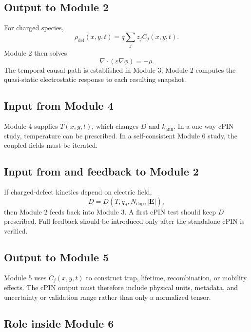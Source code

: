 \documentclass[11pt]{article}
\begin{document}
\subsection{Output to Module 2}

For charged species,
\begin{equation}
\rho_{\mathrm{def}}(x,y,t)
=
q\sum_jz_jC_j(x,y,t).
\end{equation}
Module 2 then solves
\begin{equation}
\nabla\cdot(\varepsilon\nabla\phi)
=
-\rho.
\end{equation}
The temporal causal path is established in Module 3; Module 2 computes the quasi-static electrostatic response to each resulting snapshot.

\subsection{Input from Module 4}

Module 4 supplies $T(x,y,t)$, which changes $D$ and $k_{\mathrm{ann}}$. In a one-way cPIN study, temperature can be prescribed. In a self-consistent Module 6 study, the coupled fields must be iterated.

\subsection{Input from and feedback to Module 2}

If charged-defect kinetics depend on electric field,
\begin{equation}
D=D(T,q_d,N_{\mathrm{dop}},|\mathbf E|),
\end{equation}
then Module 2 feeds back into Module 3. A first cPIN test should keep $D$ prescribed. Full feedback should be introduced only after the standalone cPIN is verified.

\subsection{Output to Module 5}

Module 5 uses $C_j(x,y,t)$ to construct trap, lifetime, recombination, or mobility effects. The cPIN output must therefore include physical units, metadata, and uncertainty or validation range rather than only a normalized tensor.

\subsection{Role inside Module 6}
\end{document}
